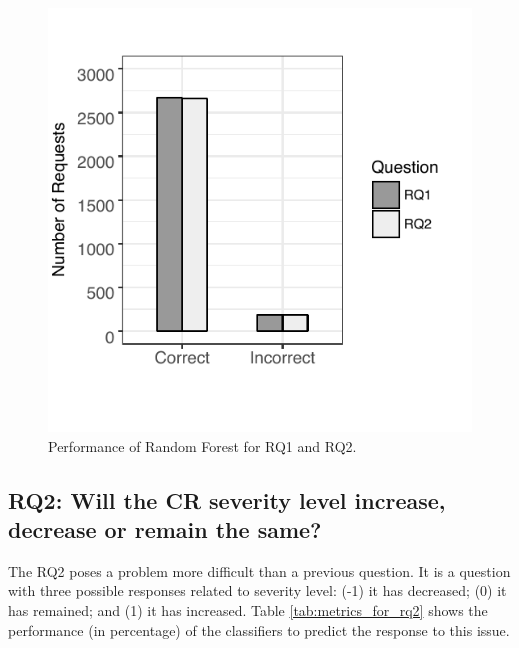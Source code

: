 \documentclass[10pt, conference]{IEEEtran}
\begin{document}
\begin{figure}[!hbt]
  \includegraphics[scale=1.0]{figures/rf_performance_for_q1q2.pdf}
  \caption{Performance of Random Forest for RQ1 and RQ2.}
  \label{fig:rf_performance_for_q1q2}
\end{figure}

\subsection{RQ2: Will the CR severity level increase, decrease or remain the same?}

The RQ2 poses a problem more difficult than a previous question. It is a question with three possible responses related to severity level: (-1) it has decreased; (0)  it has remained; and (1) it has increased. Table \ref{tab:metrics_for_rq2} shows the performance (in percentage) of the classifiers to predict the response to this issue.
\end{document}
